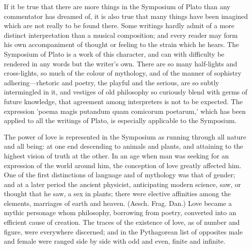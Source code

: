 \documentclass[11pt,letter]{article}
\begin{document}
\par  If it be true that there are more things in the Symposium of Plato than any commentator has dreamed of, it is also true that many things have been imagined which are not really to be found there. Some writings hardly admit of a more distinct interpretation than a musical composition; and every reader may form his own accompaniment of thought or feeling to the strain which he hears. The Symposium of Plato is a work of this character, and can with difficulty be rendered in any words but the writer's own. There are so many half-lights and cross-lights, so much of the colour of mythology, and of the manner of sophistry adhering—rhetoric and poetry, the playful and the serious, are so subtly intermingled in it, and vestiges of old philosophy so curiously blend with germs of future knowledge, that agreement among interpreters is not to be expected. The expression 'poema magis putandum quam comicorum poetarum,' which has been applied to all the writings of Plato, is especially applicable to the Symposium.

\par  The power of love is represented in the Symposium as running through all nature and all being: at one end descending to animals and plants, and attaining to the highest vision of truth at the other. In an age when man was seeking for an expression of the world around him, the conception of love greatly affected him. One of the first distinctions of language and of mythology was that of gender; and at a later period the ancient physicist, anticipating modern science, saw, or thought that he saw, a sex in plants; there were elective affinities among the elements, marriages of earth and heaven. (Aesch. Frag. Dan.) Love became a mythic personage whom philosophy, borrowing from poetry, converted into an efficient cause of creation. The traces of the existence of love, as of number and figure, were everywhere discerned; and in the Pythagorean list of opposites male and female were ranged side by side with odd and even, finite and infinite.
\end{document}
